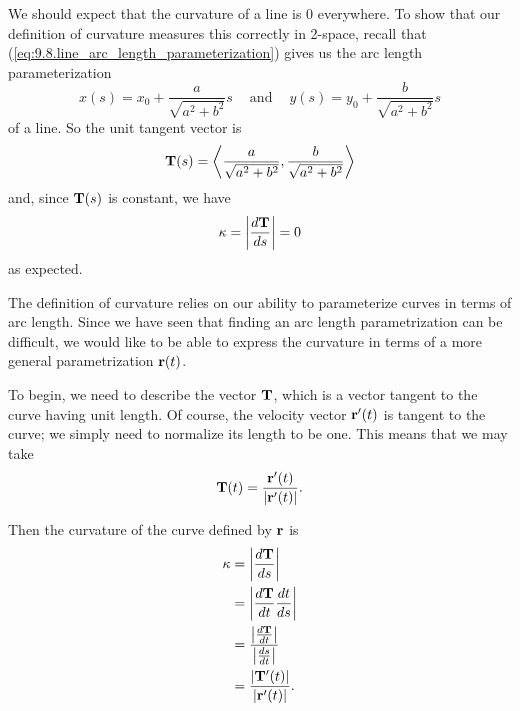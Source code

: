 

\begin{example} We should expect that the curvature of a line is 0
  everywhere. To show that our definition of curvature measures this
  correctly in 2-space, recall that
  (\ref{eq:9.8.line_arc_length_parameterization}) gives us the arc
  length parameterization
  \[x(s) = x_0+\frac{a}{\sqrt{a^2+b^2}}s \ \ \ \ \text{ and } \ \ \ \
  y(s) = y_0+\frac{b}{\sqrt{a^2+b^2}}s\] of a line. So the unit tangent vector is 
\[\mathbf{T}(s) = \left\langle \frac{a}{\sqrt{a^2+b^2}},
  \frac{b}{\sqrt{a^2+b^2}} \right\rangle\] 
and, since $\mathbf{T}(s)$ is constant, we have
\[\kappa = \left\lvert \frac{d \mathbf{T}}{ds} \right\rvert = 0\]
as expected.
\end{example}



The definition of curvature relies on our
ability to parameterize curves in terms of arc length. Since we have
seen that finding an arc length parametrization can be difficult, we
would like to be able to express the curvature in terms of a more
general parametrization $\mathbf{r}(t)$.

To begin, we need to describe the vector $\mathbf{T}$, which is
a vector tangent to the curve having unit length.  Of course, the
velocity vector $\mathbf{r}'(t)$ is tangent to the curve;  we simply need to
normalize its length to be one.  This means that we may take
$$
\mathbf{T}(t) = \frac{\mathbf{r}'(t)}{|\mathbf{r}'(t)|}.
$$

Then the curvature of the curve defined by $\mathbf{r}$ is
\begin{align*}
\kappa &= \left\lvert \frac{d \mathbf{T}}{ds} \right\rvert \\
    &= \left\lvert \frac{d \mathbf{T}}{dt} \frac{dt}{ds} \right\rvert \\
    &= \frac{\left\lvert \frac{d \mathbf{T}}{dt} \right\rvert}{ \left\lvert \frac{ds}{dt} \right\rvert } \\
    &= \frac{\left\lvert \mathbf{T}'(t) \right\rvert}{ \left\lvert \mathbf{r}'(t) \right\rvert}.
\end{align*}


